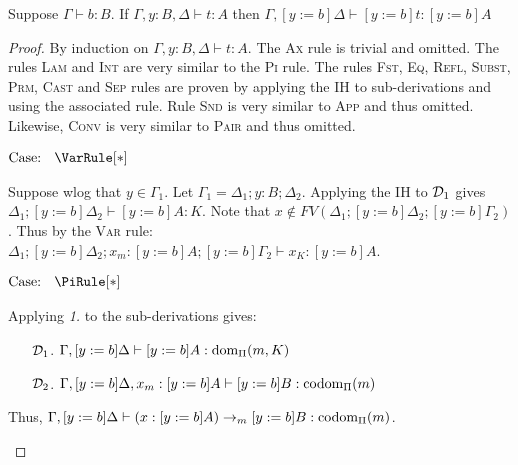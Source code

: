 \begin{lemma}[Substitution]
    \label{lem:2:subst}
    Suppose $\Gamma \vdash b : B$.
    If $\Gamma, y : B, \Delta \vdash t : A$ then $\Gamma, [y := b]\Delta \vdash [y := b]t : [y := b]A$
\end{lemma}
\begin{proof}
    By induction on $\Gamma, y : B, \Delta \vdash t : A$.
    The \textsc{Ax} rule is trivial and omitted.
    The rules \textsc{Lam} and \textsc{Int} are very similar to the \textsc{Pi} rule.
    The rules \textsc{Fst}, \textsc{Eq}, \textsc{Refl}, \textsc{Subst}, \textsc{Prm}, \textsc{Cast} and \textsc{Sep} rules are proven by applying the IH to sub-derivations and using the associated rule.
    Rule \textsc{Snd} is very similar to \textsc{App} and thus omitted.
    Likewise, \textsc{Conv} is very similar to \textsc{Pair} and thus omitted.

    $\text{Case: }\begin{array}{c} \VarRule[*] \end{array}$
    \begin{proofcase}
        Suppose wlog that $y \in \Gamma_1$.
        Let $\Gamma_1 = \Delta_1; y : B; \Delta_2$.
        Applying the IH to $\mathcal{D}_{1}$ gives $\Delta_1; [y := b]\Delta_2 \vdash [y := b]A : K$.
        Note that $x \notin FV(\Delta_1; [y := b]\Delta_2; [y := b]\Gamma_2)$.
        Thus by the \textsc{Var} rule: $\Delta_1; [y := b]\Delta_2; x_m : [y := b]A; [y := b]\Gamma_2 \vdash x_K : [y := b]A$.
    \end{proofcase}

    $\text{Case: }\begin{array}{c} \PiRule[*] \end{array}$
    \begin{proofcase}
        Applying \textit{1.} to the sub-derivations gives:
        \begin{enumerate}
            \item[$\mathcal{D}_{1}$.] $\Gamma, [y := b]\Delta \vdash [y := b]A : \textnormal{dom}_\Pi(m, K)$
            \item[$\mathcal{D}_{2}$.] $\Gamma, [y := b]\Delta, x_m : [y := b]A \vdash [y := b]B : \textnormal{codom}_\Pi(m)$
        \end{enumerate}
        Thus, $\Gamma, [y := b]\Delta \vdash (x : [y := b]A) \to_m [y := b]B : \textnormal{codom}_\Pi(m)$.
    \end{proofcase}


\end{proof}
